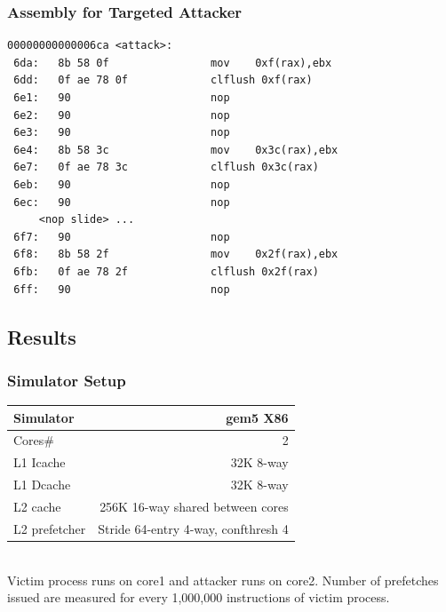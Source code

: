 \documentclass[10pt]{beamer}
\begin{document}
\begin{frame}[fragile]
\frametitle{Assembly for Targeted Attacker}
\begin{lstlisting}[caption={Attacker targeting specific PC addresses},
label={lst:targeted_attack}]
00000000000006ca <attack>:
 6da:   8b 58 0f                mov    0xf(rax),ebx
 6dd:   0f ae 78 0f             clflush 0xf(rax)
 6e1:   90                      nop
 6e2:   90                      nop
 6e3:   90                      nop
 6e4:   8b 58 3c                mov    0x3c(rax),ebx
 6e7:   0f ae 78 3c             clflush 0x3c(rax)
 6eb:   90                      nop
 6ec:   90                      nop
     <nop slide> ...
 6f7:   90                      nop
 6f8:   8b 58 2f                mov    0x2f(rax),ebx
 6fb:   0f ae 78 2f             clflush 0x2f(rax)
 6ff:   90                      nop
\end{lstlisting}
\end{frame}

\subsection{Results}

\begin{frame}
\frametitle{Simulator Setup}

\begin{tabular}{|l|r|}
    \hline
    Simulator  & gem5 X86\\
    \hline
    Cores#  & 2\\
    \hline
    L1 Icache & 32K 8-way\\
    \hline
    L1 Dcache & 32K 8-way\\
    \hline
    L2 cache & 256K 16-way shared between cores\\
    \hline
    L2 prefetcher  & Stride 64-entry 4-way, confthresh 4\\
    \hline
\end{tabular}
\\

Victim process runs on core1 and attacker runs on core2. Number of prefetches
issued are measured for every 1,000,000 instructions of victim process.
\end{frame}
\end{document}
